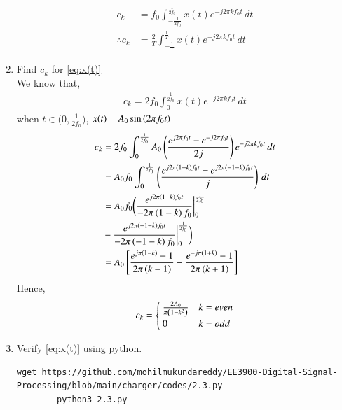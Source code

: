 \documentclass[journal,12pt,twocolumn]{IEEEtran}
\renewcommand\thesection{\arabic{section}}
\begin{document}
\begin{enumerate}[label=\thesection.\arabic*,ref=\thesection.\theenumi]
\begin{align}
    	\end{align}
    \begin{align}
  c_k &= f_0\int_{-\frac{1}{2f_0}}^{\frac{1}{2f_0}}x(t)e^{-j2\pi kf_0 t}\, dt\\
  \therefore c_k &= \frac{2}{T} \int_{-\frac{1}{T}}^{\frac{1}{T}}x(t)e^{-j2\pi kf_0 t}\, dt
    \end{align}
        \item Find $c_k$ for 
        \eqref{eq:x(t)}\\
        \solution
        We know that,
        \begin{align}
        c_k = 2f_0\int_{0}^{\frac{1}{2f_0}}x(t)e^{- j2 \pi kf_0 t}\, dt
        \end{align}
when $t \in \bigg( 0,\frac{1}{2f_0}\bigg)$, $x(t)=A_0 \sin\left(2 \pi f_0t\right)$\\
      \begin{align}
      c_k &= 2f_0\int_{0}^{\frac{1}{2f_0}}A_0 \left(\frac{e^{j2\pi f_0t}-e^{-j 2\pi f_0t}}{2j}\right) e^{- j2 \pi kf_0 t}\,dt\\
      &=A_0f_0\int_{0}^{\frac{1}{2f_0}} \left(\frac{e^{j2\pi\left(1-k\right) f_0t}-e^{j 2\pi\left(-1-k\right) f_0t}}{j}\right)\,dt\\
&=A_0f_0\bigg(\frac{e^{j2\pi\left(1-k\right) f_0t}}{-2\pi \left(1-k\right)f_0}\bigg|_0^{\frac{1}{2f_0}} \\&- \frac{e^{j2\pi\left(-1-k\right) f_0t}}{-2\pi \left(-1-k\right)f_0}\bigg|_0^{\frac{1}{2f_0}}\bigg)\\
&=A_0{}\left[\frac{e^{j\pi\left(1-k\right)}-1}{2\pi\left(k-1\right)}-\frac{e^{-j\pi\left(1+k\right)}-1}{2\pi\left(k+1\right)}\right]
      \end{align}
  Hence,
      \begin{equation}
      \label{eq:ck}
     c_k= \begin{cases}
\frac{2A_0}{\pi\left(1-k^2\right)}&k=even
\\
0&k=odd
\end{cases}
      \end{equation}
    \item Verify 
        \eqref{eq:x(t)}
        using python.\\
        \solution 
        \begin{lstlisting}
wget https://github.com/mohilmukundareddy/EE3900-Digital-Signal-Processing/blob/main/charger/codes/2.3.py
        python3 2.3.py
        \end{lstlisting}
          \begin{figure}[!ht]
			\centering

\end{figure}
\end{enumerate}
\end{document}
